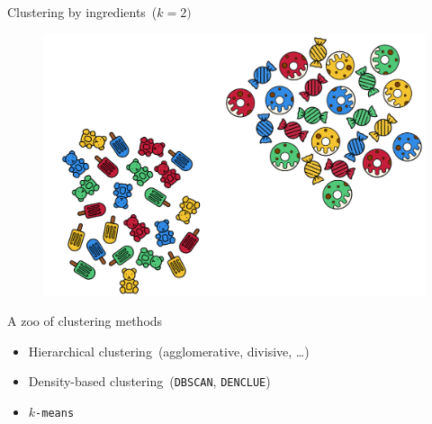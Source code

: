 \documentclass[aspectratio=169]{beamer}
\begin{document}
  \begin{frame}{Clustering by ingredients~($k = 2)$}
    \begin{figure}
      \includegraphics[width=0.75\linewidth]{Figures/Clustering_by_ingredients}
    \end{figure}
  \end{frame}

  \begin{frame}{A zoo of clustering methods}
    \begin{itemize}
      \item Hierarchical clustering~(agglomerative, divisive, \dots)
      \item Density-based clustering~(\texttt{DBSCAN}, \texttt{DENCLUE})
      \item \texttt{$k$-means}
    \end{itemize}
  \end{frame}
\end{document}
